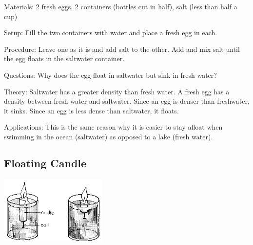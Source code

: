 \begin{multicols}{2}
\begin{description*}
\item[Materials:]{2 fresh eggs, 2 containers (bottles cut in half), salt (less than half a cup)}
\item[Setup:]{Fill the two containers with water and place a fresh egg in each.}
\item[Procedure:]{Leave one as it is and add salt to the other. Add and mix salt until the egg floats in the saltwater container.}
\item[Questions:]{Why does the egg float in saltwater but sink in fresh water?}
\item[Theory:]{Saltwater has a greater density than fresh water. A fresh egg has a density between fresh water and saltwater. Since an egg is denser than freshwater, it sinks. Since an egg is less dense than saltwater, it floats.}
\item[Applications:]{This is the same reason why it is easier to stay afloat when swimming in the ocean (saltwater) as opposed to a lake (fresh water).}
\end{description*}

\subsection{Floating Candle}

\begin{center}
\includegraphics[width=0.4\textwidth]{./img/source/floating-candle.png}
\end{center}


\end{multicols}
